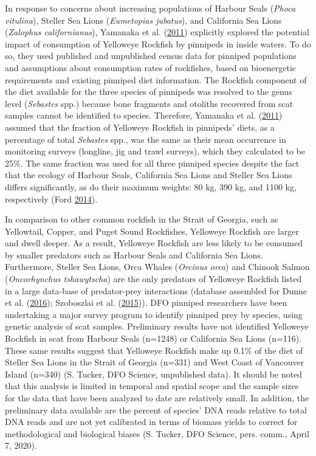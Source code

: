 \documentclass[11pt]{book}
\begin{document}
\clearpage

\label{app:pinniped-predation}

In response to concerns about increasing populations of Harbour Seals (\emph{Phoca vitulina}), Steller Sea Lions (\emph{Eumetopias jubatus}), and California Sea Lions (\emph{Zalophus californianus}), Yamanaka et al. (\protect\hyperlink{ref-yamanaka2011}{2011}) explicitly explored the potential impact of consumption of Yelloweye Rockfish by pinnipeds in inside waters. To do so, they used published and unpublished census data for pinniped populations and assumptions about consumption rates of rockfishes, based on bioenergetic requirements and existing pinniped diet information. The Rockfish component of the diet available for the three species of pinnipeds was resolved to the genus level (\emph{Sebastes} spp.) because bone fragments and otoliths recovered from scat samples cannot be identified to species. Therefore, Yamanaka et al. (\protect\hyperlink{ref-yamanaka2011}{2011}) assumed that the fraction of Yelloweye Rockfish in pinnipeds' diets, as a percentage of total \emph{Sebastes} spp., was the same as their mean occurrence in monitoring surveys (longline, jig and trawl surveys), which they calculated to be 25\%. The same fraction was used for all three pinniped species despite the fact that the ecology of Harbour Seals, California Sea Lions and Steller Sea Lions differs significantly, as do their maximum weights: 80 kg, 390 kg, and 1100 kg, respectively (Ford \protect\hyperlink{ref-ford2014}{2014}).

In comparison to other common rockfish in the Strait of Georgia, such as Yellowtail, Copper, and Puget Sound Rockfishes, Yelloweye Rockfish are larger and dwell deeper. As a result, Yelloweye Rockfish are less likely to be consumed by smaller predators such as Harbour Seals and California Sea Lions. Furthermore, Steller Sea Lions, Orca Whales (\emph{Orcinus orca}) and Chinook Salmon (\emph{Oncorhynchus tshawytscha}) are the only predators of Yelloweye Rockfish listed in a large data-base of predator-prey interactions (database assembled for Dunne et al. (\protect\hyperlink{ref-dunne2016}{2016}); Szoboszlai et al. (\protect\hyperlink{ref-szoboszlai2015}{2015})). DFO pinniped researchers have been undertaking a major survey program to identify pinniped prey by species, using genetic analysis of scat samples. Preliminary results have not identified Yelloweye Rockfish in scat from Harbour Seals (n=1248) or California Sea Lions (n=116). These same results suggest that Yelloweye Rockfish make up 0.1\% of the diet of Steller Sea Lions in the Strait of Georgia (n=331) and West Coast of Vancouver Island (n=340) (S. Tucker, DFO Science, unpublished data). It should be noted that this analysis is limited in temporal and spatial scope and the sample sizes for the data that have been analyzed to date are relatively small. In addition, the preliminary data available are the percent of species' DNA reads relative to total DNA reads and are not yet calibrated in terms of biomass yields to correct for methodological and biological biases (S. Tucker, DFO Science, pers. comm., April 7, 2020).
\end{document}
